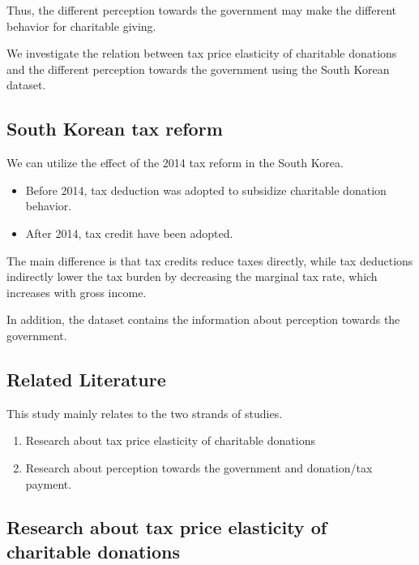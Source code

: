 \documentclass[ review  , 3p ]{elsarticle}
\providecommand{\tightlist}{%
  \setlength{\itemsep}{0pt}\setlength{\parskip}{0pt}}
\begin{document}
  Thus, the different perception towards the government may make the different behavior for charitable giving.
  
  We investigate the relation between tax price elasticity of charitable donations and the different perception towards the government using the South Korean dataset.
  
  \hypertarget{south-korean-tax-reform}{%
  \subsection{South Korean tax reform}\label{south-korean-tax-reform}}
  
  We can utilize the effect of the 2014 tax reform in the South Korea.
  
  \begin{itemize}
  \tightlist
  \item
    Before 2014, tax deduction was adopted to subsidize charitable donation behavior.
  \item
    After 2014, tax credit have been adopted.
  \end{itemize}
  
  The main difference is that tax credits reduce taxes directly, while tax deductions indirectly lower the tax burden by decreasing the marginal tax rate, which increases with gross income.
  
  In addition, the dataset contains the information about perception towards the government.
  
  \hypertarget{related-literature}{%
  \subsection{Related Literature}\label{related-literature}}
  
  This study mainly relates to the two strands of studies.
  
  \begin{enumerate}
  \def\labelenumi{\arabic{enumi}.}
  \tightlist
  \item
    Research about tax price elasticity of charitable donations
  \item
    Research about perception towards the government and donation/tax payment.
  \end{enumerate}
  
  \hypertarget{research-about-tax-price-elasticity-of-charitable-donations}{%
  \subsection{Research about tax price elasticity of charitable donations}\label{research-about-tax-price-elasticity-of-charitable-donations}}
  
\end{document}
